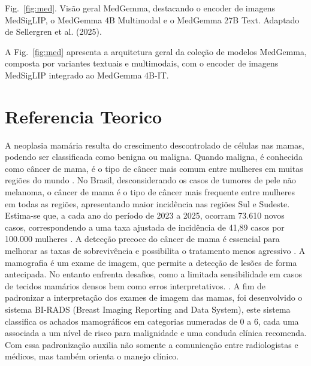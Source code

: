 \documentclass[12pt]{article}
\begin{document}
Fig.~\ref{fig:med}. Visão geral MedGemma, destacando o encoder de imagens MedSigLIP, o MedGemma 4B Multimodal e o MedGemma 27B Text. Adaptado de Sellergren et al. (2025).

A Fig.~\ref{fig:med} apresenta a arquitetura geral da coleção de modelos MedGemma, composta por variantes textuais e multimodais, com o encoder de imagens MedSigLIP integrado ao MedGemma 4B-IT.



\section{Referencia Teorico}
A neoplasia mamária resulta do crescimento descontrolado de células nas mamas, podendo ser classificada como benigna ou maligna. Quando maligna, é conhecida como câncer de mama, é o tipo de câncer mais comum entre mulheres em muitas regiões do mundo \cite{inca2025}. No Brasil, desconsiderando os casos de tumores de pele não melanoma, o câncer de mama é o tipo de câncer mais frequente entre mulheres em todas as regiões, apresentando maior incidência nas regiões Sul e Sudeste. Estima-se que, a cada ano do período de 2023 a 2025, ocorram 73.610 novos casos, correspondendo a uma taxa ajustada de incidência de 41,89 casos por 100.000 mulheres \cite{inca2025}. A detecção precoce do câncer de mama é essencial para melhorar as taxas de sobrevivência e possibilita o tratamento menos agressivo \cite{paulinelli2004diagnostico}. A mamografia é um exame de imagem, que permite a detecção de lesões de forma antecipada. No entanto enfrenta desafios, como a limitada sensibilidade em casos de tecidos mamários densos bem como erros interpretativos. \cite{guerreiro2024ia}. A fim de padronizar a interpretação dos exames de imagem das mamas, foi desenvolvido o sistema BI-RADS (Breast Imaging Reporting and Data System), este sistema classifica os achados mamográficos em categorias numeradas de 0 a 6, cada uma associada a um nível de risco para malignidade e uma conduda clínica recomenda. Com essa padronização auxilia não somente a comunicação entre radiologistas e médicos, mas também orienta o manejo clínico.
\end{document}
